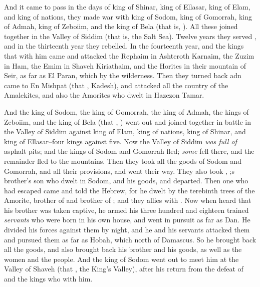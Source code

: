 
\bverse And it came to pass in the days of  king of Shinar,  king of Ellasar,  king of Elam, and  king of nations, 
\bverse \that they made war with  king of Sodom,  king of Gomorrah,  king of Admah,  king of Zeboiim, and the king of Bela (that is, ).
\bverse All these joined together in the Valley of Siddim (that is, the Salt Sea).
\bverse Twelve years they served , and in the thirteenth year they rebelled.
\bverse In the fourteenth year,  and the kings that \were with him came and attacked the Rephaim in Ashteroth Karnaim, the Zuzim in Ham, the Emim in Shaveh Kiriathaim,
\bverse and the Horites in their mountain of Seir, as far as El Paran, which \is by the wilderness.
\bverse Then they turned back adn came to En Mishpat (that \is, Kadesh), and attacked all the country of the Amalekites, and also the Amorites who dwelt in Hazezon Tamar.



\bverse And the king of Sodom, the king of Gomorrah, the king of Admah, the kings of Zeboiim, and the king of Bela (that \is, ) went out and joined together in battle in the Valley of Siddim
\bverse against  king of Elam,  king of nations,  king of Shinar, and  king of Ellasar--four kings against five.
\bverse Now the Valley of Siddim \textit{was full of} asphalt pits; and the kings of Sodom and Gomorrah fled; \textit{some} fell there, and the remainder fled to the mountains.
\bverse Then they took all the goods of Sodom and Gomorrah, and all their provisions, and went their way.
\bverse They also took , ;s brother's son who dwelt in Sodom, and his goods, and departed.
\bverse Then one who had escaped came and told  the Hebrew, for he dwelt by the terebinth trees of  the Amorite, brother of  and brother of ; and they \were allies with .
\bverse Now when  heard that his brother was taken captive, he armed his three hundred and eighteen trained \textit{servants} who were born in his own house, and went in pursuit as far as Dan.
\bverse He divided his forces against them by night, and he and his servants attacked them and pursued them as far as Hobah, which \is north of Damascus.
\bverse So he brought back all the goods, and also brought back his brother  and his goods, as well as the women and the people.
\bverse And the king of Sodom went out to meet him at the Valley of Shaveh (that \is, the King's Valley), after his return from the defeat of  and the kings who \were with him.


\bverse 
\bverse 
\bverse 
\bverse 
\bverse 
\bverse 
\bverse 
